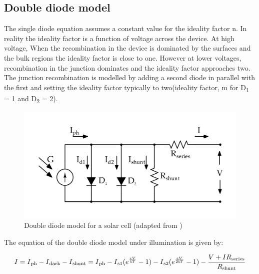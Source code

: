 \subsection{Double diode model}\label{sec:DDM}

The single diode equation assumes a constant value for the ideality factor n. In reality the ideality factor is a function of voltage across the device. At high voltage, When the recombination in the device is dominated by the surfaces and the bulk regions the ideality factor is close to one. However at lower voltages, recombination in the junction dominates and the ideality factor approaches two. The junction recombination is modelled by adding a second diode in parallel with the first and setting the ideality factor typically to two(ideality factor, m for D\textsubscript{1} = 1 and D\textsubscript{2} = 2)\cite{pv_education_org}.\\

 \begin{figure}[H]
  \begin{center}
  \includegraphics[width=\textwidth]{images/Double_diode_model}
  \caption{ Double diode model for a solar cell (adapted from \cite{pv_education_org}) }
  \label{fig:Double_EQu_cell}
  \end{center}
  \end{figure}
  
The equation of the double diode model under illumination is given by:  

  \begin{equation}
   \begin{aligned}
    I = I\textsubscript{ph} - I\textsubscript{dark} - I\textsubscript{shunt} = I\textsubscript{ph} -  I\textsubscript{s1} (e^{\frac{eV}{\textit{k}T}}-1) - I\textsubscript{s2} (e^{\frac{eV}{2\textit{k}T}}-1)- \dfrac{V+IR\textsubscript{series}}{R\textsubscript{shunt}}
     \label{eq:equ_current_double}
    \end{aligned}
    \end{equation}
  
